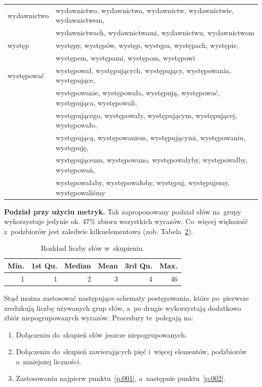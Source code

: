 \documentclass{praca1}
\begin{document}
\begin{table}[h]
\begin{tabular}{|l|l|}
   \hline
wydawnictwo & wydawnictwo, wydawnictwa, wydawnictw, wydawnictwie, wydawnictwem,\\ &  wydawnictwach, wydawnictwami, wydawnictwu, wydawnictwom \\ 
   \hline
występ & występy, występów, występ, występu, występach, występie, \\ & występem, występami, występom, występowi \\ 
   \hline
występować & występował, występujących, występujący, występowania, występujące, \\ &  występowanie, występowała, występują, występować, występująca, występowali, \\ &  występującego, występowały, występującym, występującej, występowało,\\ &  występującą, występowaniem, występującymi, występowaniu, występuję, \\ & występującemu, występowano, występowałyby, występowałby, występowań, \\ & występowałaby, występowałoby, występuj, występujemy, występowaliśmy \\  
   \hline
\end{tabular}
\label{tab:003}
\end{table}


\textbf{Podział przy użyciu metryk.}
Tak zaproponowany podział słów na~grupy wykorzystuje jedynie ok. $47\%$ zbioru wszystkich wyrazów. Co~więcej większość z~podzbiorów jest zaledwie kilkuelementowa (zob. Tabela~\ref{tab:004}). 

\begin{table}[!h]
\centering
\caption{Rozkład liczby słów w~skupieniu.}\smallskip
\begin{tabular}{|r|r|r|r|r|r|}
  \hline
Min. & 1st Qu. & Median & Mean & 3rd Qu. & Max. \\ 
  \hline
1 & 1 & 2 & 3 & 4 & 46 \\ 
   \hline
\end{tabular}
\label{tab:004}
\end{table}


Stąd można zastosować następujące schematy postępowania, które po~pierwsze zredukują liczbę używanych grup słów, a~po drugie wykorzystają dodatkowo zbiór niepogrupowanych wyrazów. Procedury te~polegają na:
\begin{enumerate}
\item\label{p:001} Dołączeniu do~skupień słów jeszcze niepogrupowanych.
\item\label{p:002} Dołączeniu do~skupień zawierających pięć i~więcej elementów, podzbiorów o~mniejszej liczności.
\item Zastosowaniu najpierw punktu~\ref{p:001}, a~następnie punktu~\ref{p:002}.
\end{enumerate}
\end{document}
